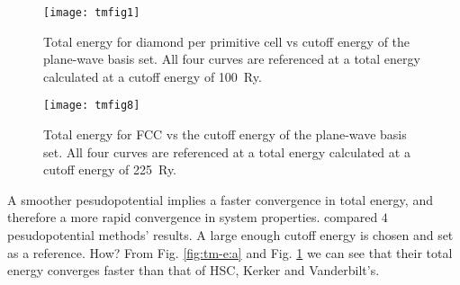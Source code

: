 \begin{figure}[H]
	\centering
	\begin{minipage}[b]{.48\linewidth}
		\centering
		\texttt{[image: tmfig1]}
		\caption{Total energy for diamond per primitive cell vs cutoff energy
			of the plane-wave basis set. All four curves are referenced at a total
			energy calculated at a cutoff energy of \SI{100}{Ry}.
			\cite{Troullier:1991ey}}
		\label{fig:tm-e:a}
	\end{minipage}%
	\hfill
	\begin{minipage}[b]{.48\linewidth}
		\centering
		\texttt{[image: tmfig8]}
		\caption{Total energy for FCC  vs the cutoff energy
			of the plane-wave basis set. All four curves are referenced at a total
			energy calculated at a cutoff energy of \SI{225}{Ry}.
			\cite{Troullier:1991ey}}
		\label{fig:tm-e:b}
	\end{minipage}
\end{figure}
A smoother pesudopotential implies a faster convergence in
total energy, and therefore a more rapid convergence in system properties.
\citeauthor{Troullier:1991ey} compared $4$ pesudopotential methods'
results. A large enough cutoff energy is chosen and set as a reference.
How?
From Fig. \ref{fig:tm-e:a} and Fig. \ref{fig:tm-e:b} we can see that their
total energy converges faster than that of HSC, Kerker and Vanderbilt's.
